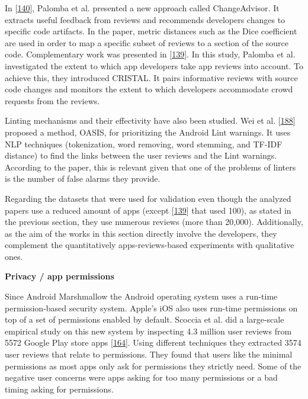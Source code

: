 \documentclass[]{book}
\begin{document}
In {[}\protect\hyperlink{ref-palomba2017recommending}{140}{]}, Palomba
et al. presented a new approach called ChangeAdvisor. It extracts useful
feedback from reviews and recommends developers changes to specific code
artifacts. In the paper, metric distances such as the Dice coefficient
are used in order to map a specific subset of reviews to a section of
the source code. Complementary work was presented in
{[}\protect\hyperlink{ref-palomba2018crowdsourcing}{139}{]}. In this
study, Palomba et al. investigated the extent to which app developers
take app reviews into account. To achieve this, they introduced CRISTAL.
It pairs informative reviews with source code changes and monitors the
extent to which developers accommodate crowd requests from the reviews.

Linting mechanisms and their effectivity have also been studied. Wei et
al. {[}\protect\hyperlink{ref-wei2017oasis}{188}{]} proposed a method,
OASIS, for prioritizing the Android Lint warnings. It uses NLP
techniques (tokenization, word removing, word stemming, and TF-IDF
distance) to find the links between the user reviews and the Lint
warnings. According to the paper, this is relevant given that one of the
problems of linters is the number of false alarms they provide.

Regarding the datasets that were used for validation even though the
analyzed papers use a reduced amount of apps (except
{[}\protect\hyperlink{ref-palomba2018crowdsourcing}{139}{]} that used
100), as stated in the previous section, they use numerous reviews (more
than 20,000). Additionally, as the aim of the works in this section
directly involve the developers, they complement the quantitatively
apps-reviews-based experiments with qualitative ones.

\textbf{Privacy / app permissions}

Since Android Marshmallow the Android operating system uses a run-time
permission-based security system. Apple's iOS also uses run-time
permissions on top of a set of permissions enabled by default. Scoccia
et al. did a large-scale empirical study on this new system by
inspecting 4.3 million user reviews from 5572 Google Play store apps
{[}\protect\hyperlink{ref-scoccia2018investigation}{164}{]}. Using
different techniques they extracted 3574 user reviews that relate to
permissions. They found that users like the minimal permissions as most
apps only ask for permissions they strictly need. Some of the negative
user concerns were apps asking for too many permissions or a bad timing
asking for permissions.
\end{document}
